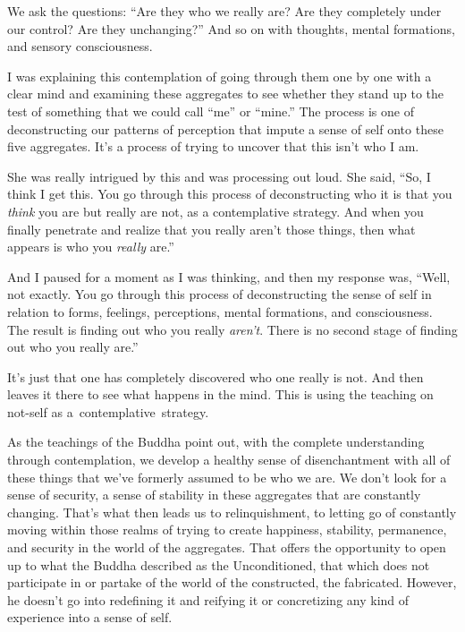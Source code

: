 \enlargethispage{1\baselineskip}
We ask the questions: ``Are they who we really are? Are they completely under our control? Are they unchanging?'' And so on with thoughts, mental formations, and sensory consciousness.

I was explaining this contemplation of going through them one by one with a clear mind and examining these aggregates to see whether they stand up to the test of something that we could call ``me'' or ``mine.'' The process is one of deconstructing our patterns of perception that impute a sense of self onto these five aggregates. It's a process of trying to uncover that this isn't who I am.

She was really intrigued by this and was processing out loud. She said, ``So, I think I get this. You go through this process of deconstructing who it is that you \emph{think} you are but really are not, as a contemplative strategy. And when you finally penetrate and realize that you really aren't those things, then what appears is who you \emph{really} are.''

And I paused for a moment as I was thinking, and then my response was, ``Well, not exactly. You go through this process of deconstructing the sense of self in relation to forms, feelings, perceptions, mental formations, and consciousness. The result is finding out who you really \emph{aren't}. There is no second stage of finding out who you really are.''

It's just that one has completely discovered who one really is not. And then leaves it there to see what happens in the mind. This is using the teaching on not-self as \mbox{a contemplative strategy.}

As the teachings of the Buddha point out, with the complete understanding through contemplation, we develop a healthy sense of disenchantment with all of these things that we've formerly assumed to be who we are. We don't look for a sense of security, a sense of stability in these aggregates that are constantly changing. That's what then leads us to relinquishment, to letting go of constantly moving within those realms of trying to create happiness, stability, permanence, and security in the world of the aggregates. That offers the opportunity to open up to what the Buddha described as the Unconditioned, that which does not participate in or partake of the world of the constructed, the fabricated. However, he doesn't go into redefining it and reifying it or concretizing any kind of experience into a sense of self.

